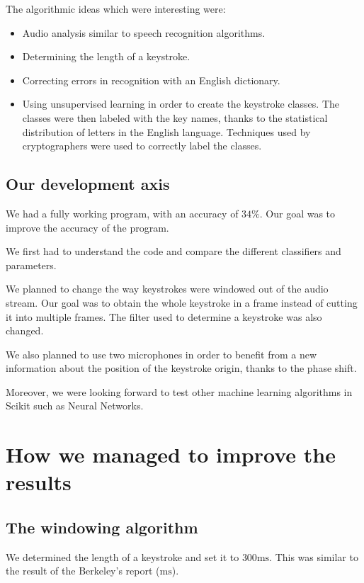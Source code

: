 \documentclass[12pt,a4paper]{article}
\begin{document}
The algorithmic ideas which were interesting were:
\begin{itemize}
\item Audio analysis similar to speech recognition algorithms. %
\item Determining the length of a keystroke. 
\item Correcting errors in recognition with an English dictionary. 
\item Using unsupervised learning in order to create the keystroke classes. The classes were then labeled with the key names, thanks to the statistical distribution of letters in the English language. Techniques used by cryptographers were used to correctly label the classes. 
\end{itemize}

\subsection{Our development axis}

We had a fully working program, with an accuracy of $34 \%$. Our goal was to improve the accuracy of the program. 

We first had to understand the code and compare the different classifiers and parameters. 

We planned to change the way keystrokes were windowed out of the audio stream. Our goal was to obtain the whole keystroke in a frame instead of cutting it into multiple frames. The filter used to determine a keystroke was also changed. 

We also planned to use two microphones in order to benefit from a new information about the position of the keystroke origin, thanks to the phase shift. 

Moreover, we were looking forward to test other machine learning algorithms in Scikit such as Neural Networks. 


\section{How we managed to improve the results}

\subsection{The windowing algorithm}

We determined the length of a keystroke and set it to $300 \mathrm{ms}$. This was similar to the result of the Berkeley's report \cite{Zhuang} ($ \mathrm{ms}$). 
\end{document}
